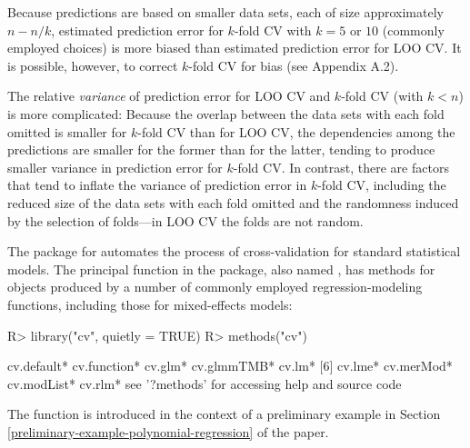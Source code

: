 \documentclass[
]{jss}
\begin{document}
Because predictions are based on smaller data sets, each of size
approximately \(n - n/k\), estimated prediction error for \(k\)-fold CV
with \(k = 5\) or \(10\) (commonly employed choices) is more biased than
estimated prediction error for LOO CV. It is possible, however, to
correct \(k\)-fold CV for bias (see Appendix A.2).

The relative \emph{variance} of prediction error for LOO CV and
\(k\)-fold CV (with \(k < n\)) is more complicated: Because the overlap
between the data sets with each fold omitted is smaller for \(k\)-fold
CV than for LOO CV, the dependencies among the predictions are smaller
for the former than for the latter, tending to produce smaller variance
in prediction error for \(k\)-fold CV. In contrast, there are factors
that tend to inflate the variance of prediction error in \(k\)-fold CV,
including the reduced size of the data sets with each fold omitted and
the randomness induced by the selection of folds---in LOO CV the folds
are not random.

The  package for  automates the process of
cross-validation for standard  statistical models. The
principal function in the package, also named , has methods
for objects produced by a number of commonly employed
regression-modeling functions, including those for mixed-effects models:

\begin{CodeChunk}
\begin{CodeInput}
R> library("cv", quietly = TRUE)
R> methods("cv")
\end{CodeInput}
\begin{CodeOutput}
[1] cv.default*  cv.function* cv.glm*      cv.glmmTMB*  cv.lm*
[6] cv.lme*      cv.merMod*   cv.modList*  cv.rlm*
see '?methods' for accessing help and source code
\end{CodeOutput}
\end{CodeChunk}

The  function is introduced in the context of a preliminary
example in Section \ref{preliminary-example-polynomial-regression} of
the paper.
\end{document}
